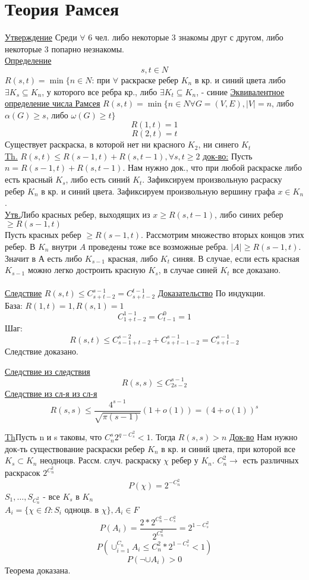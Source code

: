 \section{Теория Рамсея}

\underline{Утверждение}
Среди $\forall$ 6 чел. либо некоторые 3 знакомы друг с другом, либо некоторые 3 попарно незнакомы.\\
\underline{Определение}$$s,t \in N$$
$ R(s,t)=\min\{n \in N $: при $ \forall $ раскраске ребер $K_n$ в кр. и синий цвета либо $\exists K_s \subseteq K_n $, 
у  которого все ребра кр., либо $\exists K_t \subseteq K_n $, - синие
\underline{Эквивалентное определение числа Рамсея}
$R(s,t) = \min\{n \in N \forall G=(V,E), |V|=n$, либо $\alpha(G) \ge s$, либо $\omega(G) \ge t\}$\\
$$R(1,t) = 1$$
$$R(2,t) = t$$
Существует раскраска, в которой нет ни красного $K_2$, ни синего $K_t$\\

\underline{Th.} $R(s,t) \le R(s-1,t) + R(s,t-1), \forall s,t \ge 2$
\underline{док-во:}
Пусть $n=R(s-1,t) + R(s,t-1)$. Нам нужно док., что при любой раскраске либо есть красный $K_s$, либо есть синий $K_t$.
Зафиксируем произвольную расраску ребер $K_n$ в кр. и синий цвета.
Зафиксируем произвольную вершину графа $x \in K_n$.\\
\underline{Утв.}Либо красных ребер, выходящих из $x \ge R(s,t-1)$, либо синих ребер $\ge R(s-1,t)$\\
Пусть красных ребер $\ge R(s-1,t)$. Рассмотрим множество вторых концов этих ребер.
В $K_n$ внутри $A$ проведены тоже все возможные ребра. $|A| \ge R(s-1,t)$. 
Значит в А есть либо $K_{s-1}$ красная, либо $K_t$ синяя. 
В случае, если есть красная $K_{s-1}$ можно легко достроить красную $K_s$, в случае синей $K_t$ все доказано.\\
\\

\underline{Следствие}
$R(s,t) \le C_{s+t-2}^{s-1}=C_{s+t-2}^{t-1}$
\underline{Доказательство}
По индукции.\\
База:
$R(1,t)=1, R(s,1) = 1$
$$C_{1+t-2}^{1-1}=C_{t-1}^0=1$$
Шаг:$$R(s,t) \le C_{s-1+t-2}^{s-2} + C_{s+t-1-2}^{s-1}=C_{s+t-2}^{s-1}$$
Следствие доказано.

\underline{Следствие из следствия}
$$R(s,s) \le C_{2s-2}^{s-1}$$
\underline{Следствие из сл-я из сл-я}
$$R(s,s) \le \frac{4^{s-1}}{\sqrt{\pi(s-1)}}(1 + o(1)) = (4 + o(1))^s$$

\underline{Th}Пусть n  и s таковы, что $C_n^s2^{q-C_s^2}<1$. Тогда $R(s,s) > n$
\underline{Док-во}
Нам нужно док-ть существование раскраски ребер $K_n$ в кр. и синий  цвета, при которой все $K_s \subset K_n$ неодноцв.
Рассм. случ. раскраску $\chi$ ребер у $K_n$. $C_n^2 \to $ есть различных раскрасок $2^{C_n^2}$
$$P(\chi)=2^{-C_n^2}$$
$S_1,\ldots,S_{C_n^2}$ - все $K_s$ в $K_n$\\
$A_i = \{\chi \in \Omega: S_i$ одноцв. в $\chi\}, A_i \in F$
$$P(A_i)=\frac{2*2^{C_n^2-C_s^2}}{2^{C_n^2}}=2^{1-C_s^2}$$
$$P(\cup^{C_n}_{i=1}A_i \le C_n^2*2^{1-C_s^2} < 1)$$
$$P(\neg \cup A_i) > 0$$
Теорема доказана.\\
\\

